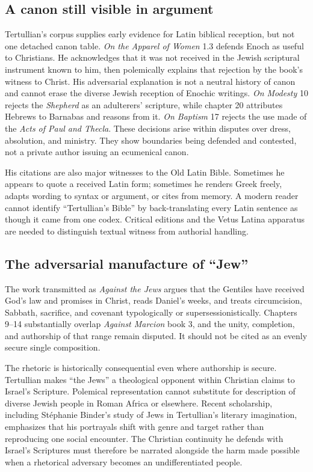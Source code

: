 \subsection{A canon still visible in argument}

Tertullian's corpus supplies early evidence for Latin biblical reception, but
not one detached canon table. \emph{On the Apparel of Women} 1.3 defends Enoch
as useful to Christians. He acknowledges that it was not received in the
Jewish scriptural instrument known to him, then polemically explains that
rejection by the book's witness to Christ. His adversarial explanation is not a
neutral history of canon and cannot erase the diverse Jewish reception of
Enochic writings. \emph{On Modesty} 10 rejects the \emph{Shepherd} as an
adulterers' scripture, while chapter 20 attributes Hebrews to Barnabas and
reasons from it. \emph{On Baptism} 17 rejects the use made of the \emph{Acts of
Paul and Thecla}. These decisions arise within disputes over dress, absolution,
and ministry. They show boundaries being defended and contested, not a private
author issuing an ecumenical canon.

His citations are also major witnesses to the Old Latin Bible. Sometimes he
appears to quote a received Latin form; sometimes he renders Greek freely,
adapts wording to syntax or argument, or cites from memory. A modern reader
cannot identify ``Tertullian's Bible'' by back-translating every Latin sentence
as though it came from one codex. Critical editions and the Vetus Latina
apparatus are needed to distinguish textual witness from authorial handling.

\subsection{The adversarial manufacture of ``Jew''}

The work transmitted as \emph{Against the Jews} argues that the Gentiles have
received God's law and promises in Christ, reads Daniel's weeks, and treats
circumcision, Sabbath, sacrifice, and covenant typologically or
supersessionistically. Chapters 9--14 substantially overlap \emph{Against
Marcion} book 3, and the unity, completion, and authorship of that range remain
disputed. It should not be cited as an evenly secure single composition.

The rhetoric is historically consequential even where authorship is secure.
Tertullian makes ``the Jews'' a theological opponent within Christian claims to
Israel's Scripture. Polemical representation cannot substitute for description
of diverse Jewish people in Roman Africa or elsewhere. Recent scholarship,
including St\'ephanie Binder's study of Jews in Tertullian's literary
imagination, emphasizes that his portrayals shift with genre and target rather
than reproducing one social encounter. The Christian continuity he defends
with Israel's Scriptures must therefore be narrated alongside the harm made
possible when a rhetorical adversary becomes an undifferentiated people.

